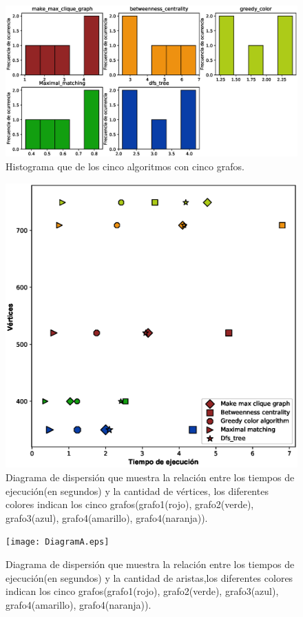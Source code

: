 \documentclass{article}
\begin{document}
\begin{center}
\begin{figure}[h]
\includegraphics[scale=0.6]{Histograma.eps}
\caption{Histograma que de los cinco algoritmos con cinco grafos.}
\end{figure}
\begin{figure}[h]
\includegraphics[scale=0.7]{DiagramVertices.eps}
\caption{Diagrama de dispersión que muestra la relación entre los tiempos de ejecución(en segundos) y la cantidad de vértices, los diferentes colores indican los cinco grafos(grafo1(rojo), grafo2(verde), grafo3(azul), grafo4(amarillo), grafo4(naranja)).}
\end{figure}
\begin{figure}[h]
\texttt{[image: DiagramA.eps]}
\caption{Diagrama de dispersión que muestra la relación entre los tiempos de ejecución(en segundos) y la cantidad de aristas,los diferentes colores indican los cinco grafos(grafo1(rojo), grafo2(verde), grafo3(azul), grafo4(amarillo), grafo4(naranja)).}
\end{figure}
 \end{center}
\newpage

\newpage


\end{document}
